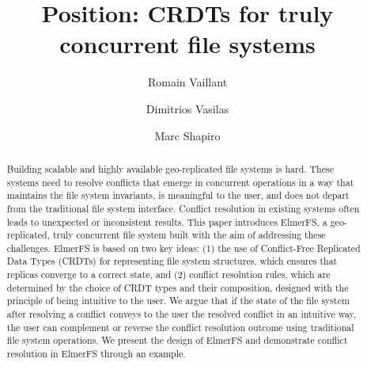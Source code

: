 \documentclass[sigconf, anonymous, 10pt]{acmart}
\begin{document}
\title{Position: CRDTs for truly concurrent file systems}

\author{Romain Vaillant}

\author{Dimitrios Vasilas}

\author{Marc Shapiro}

\renewcommand{\shortauthors}{R. Vaillant et al.}

\begin{abstract}
Building scalable and highly available geo-replicated file systems is hard.
These systems need to resolve conflicts that emerge in concurrent operations in a way
that maintains the file system invariants, is meaningful to the user,
and does not depart from the traditional file system interface.
Conflict resolution in existing systems often leads to unexpected or inconsistent
results. This paper introduces ElmerFS, a geo-replicated, truly concurrent
file system built with the aim of addressing these challenges.
ElmerFS is based on two key ideas: (1) the use of Conflict-Free
Replicated Data Types (CRDTs) for representing file system structures, which
ensures that replicas converge to a correct state,
and (2) conflict resolution rules, which are determined by the choice
of CRDT types and their composition, designed with the principle of being intuitive to the user.
We argue that if the state of the file system after resolving a conflict conveys
to the user the resolved conflict in an intuitive way,
the user can complement or reverse the conflict resolution outcome using
traditional file system operations.
We present the design of ElmerFS and demonstrate conflict resolution
in ElmerFS through an example.

\end{abstract}

\end{document}
